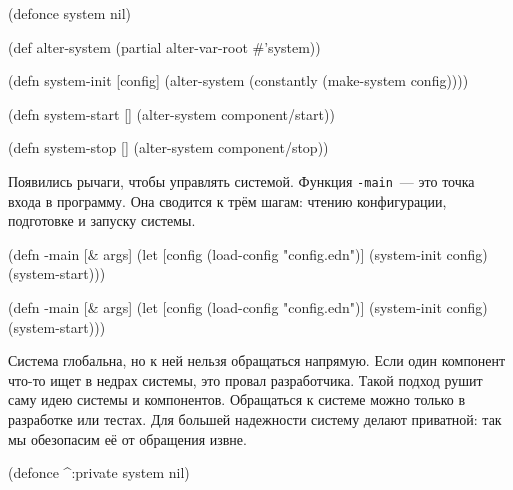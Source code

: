\else

\begin{english}
  \begin{clojure}
(defonce system nil)

(def alter-system (partial alter-var-root #'system))

(defn system-init [config]
  (alter-system (constantly (make-system config))))

(defn system-start []
  (alter-system component/start))

(defn system-stop []
  (alter-system component/stop))
  \end{clojure}
\end{english}

\fi


Появились рычаги, чтобы управлять системой. Функция \verb|-main|~--- это точка
входа в программу. Она сводится к трём шагам: чтению конфигурации, подготовке и
запуску системы.

\ifx\DEVICETYPE\MOBILE

\begin{english}
  \begin{clojure}
(defn -main [& args]
  (let [config
        (load-config "config.edn")]
    (system-init config)
    (system-start)))
  \end{clojure}
\end{english}

\else

\begin{english}
  \begin{clojure}
(defn -main [& args]
  (let [config (load-config "config.edn")]
    (system-init config)
    (system-start)))
  \end{clojure}
\end{english}

\fi

Система глобальна, но к ней нельзя обращаться напрямую. Если один компонент
что-то ищет в недрах системы, это провал разработчика. Такой подход рушит саму
идею системы и компонентов. Обращаться к системе можно только в разработке или
тестах. Для большей надежности систему делают приватной: так мы обезопасим
её от обращения извне.


\begin{english}
  \begin{clojure}
(defonce ^:private system nil)
  \end{clojure}
\end{english}

